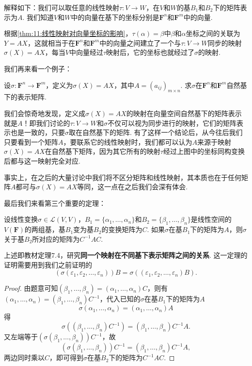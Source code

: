 解释如下：我们可以取任意的线性映射$\tau:V\to W$，在$V$和$W$的基$B_1$和$B_2$下的矩阵表示为$A$. 我们知道$V$和$W$中的向量在基下的坐标分别是$\mathbf{F}^n$和$\mathbf{F}^m$中的向量.

根据\autoref{thm:11:线性映射对向量坐标的影响}，$\tau(\alpha)=\beta$中$\beta$和$\alpha$坐标之间的关联为$Y=AX$，这就相当于在$\mathbf{F}^n$和$\mathbf{F}^m$中的向量之间建立了一个与$\tau:V\to W$同步的映射$\sigma(X)=AX$，每当$V$中向量经过$\tau$映射后，它的坐标也就经过了$\sigma$的映射.

我们再来看一个例子：
\begin{example}
    设$\sigma:\mathbf{F}^n\to\mathbf{F}^m$，定义为$\sigma(X)=AX$，其中$A=(a_{ij})_{m\times n}$. 求$\sigma$在$\mathbf{F}^n$和$\mathbf{F}^m$自然基下的表示矩阵.
\end{example}

\begin{solution}

\end{solution}

我们会惊奇地发现，定义成$\sigma(X)=AX$的映射在向量空间自然基下的矩阵表示就是$A$！即我们讨论的$\tau:V\to W$和$\sigma$不仅可以视为同步进行的映射，它们的矩阵表示也是一致的，只要$\sigma$取在自然基下的矩阵. 有了这样一个结论后，从今往后我们只要看到一个矩阵$A$，要联系它的线性映射时，我们都可以认为$A$来源于映射$\sigma(X)=AX$在自然基下矩阵，因为其它所有的映射$\tau$经过上图中的坐标同构变换后都与这一映射完全对应.

事实上，在之后的大量讨论中我们将不区分矩阵和线性映射，其本质也在于任何矩阵$A$都可与$\sigma(X)=AX$等同，这一点在之后我们会深有体会.

最后我们来看第三个重要的定理：
\begin{theorem}[基的选择对映射矩阵的影响] \label{thm:11:基的选择对映射矩阵的影响}
    设线性变换$\sigma \in \mathcal{L}(V,V)$，$B_1=\{\alpha_1,\ldots,\alpha_n\}$和$B_2=\{\beta_1,\ldots,\beta_n\}$是线性空间的$V(\mathbf{F})$的两组基，基$B_1$变为基$B_2$的变换矩阵为$C$. 如果$\sigma$在基$B_1$下的矩阵为$A$，则$\sigma$关于基$B_2$所对应的矩阵为$C^{-1}AC$.
\end{theorem}
上述即教材定理7.4，研究\textbf{同一个映射在不同基下表示矩阵之间的关系}. 这一定理的证明需要用到我们之前证明的
\[(\sigma(\varepsilon_1,\varepsilon_2,\ldots,\varepsilon_n))B=\sigma((\varepsilon_1,\varepsilon_2,\ldots,\varepsilon_n)B).\]

\begin{proof}
    由题意可知$(\beta_1,\ldots,\beta_n)=(\alpha_1,\ldots,\alpha_n)C$，则有$(\alpha_1,\ldots,\alpha_n)=(\beta_1,\ldots,\beta_n)C^{-1}$，代入已知的$\sigma$在基$B_1$下的矩阵为$A$
    \[\sigma(\alpha_1,\ldots,\alpha_n)=(\alpha_1,\ldots,\alpha_n)A\]
    得
    \[\sigma((\beta_1,\ldots,\beta_n)C^{-1})=(\beta_1,\ldots,\beta_n)C^{-1}A.\]
    又左端等于$(\sigma(\beta_1,\ldots,\beta_n))C^{-1}$，故
    \[(\sigma(\beta_1,\ldots,\beta_n))C^{-1}=(\beta_1,\ldots,\beta_n)C^{-1}A,\]
    两边同时乘以$C$，即可得到$\sigma$在基$B_2$下的矩阵为$C^{-1}AC$.
\end{proof}

